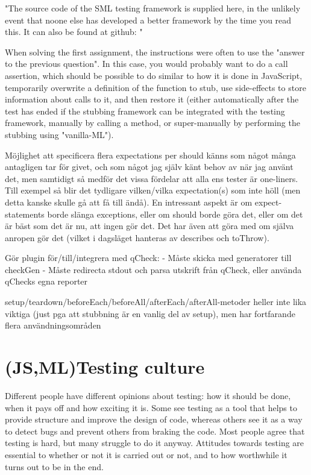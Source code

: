\documentclass[11pt]{article}
\begin{document}
"The source code of the SML testing framework is supplied here, in the unlikely event that noone else has developed a better framework by the time you read this. It can also be found at github: \url{}"

When solving the first assignment, the instructions were often to use the "answer to the previous question". In this case, you would probably want to do a call assertion, which should be possible to do similar to how it is done in JavaScript, temporarily overwrite a definition of the function to stub, use side-effects to store information about calls to it, and then restore it (either automatically after the test has ended if the stubbing framework can be integrated with the testing framework, manually by calling a method, or super-manually by performing the stubbing using "vanilla-ML").

Möjlighet att specificera flera expectations per should känns som något många antagligen tar för givet, och som något jag själv känt behov av när jag använt det, men samtidigt så medför det vissa fördelar att alla ens tester är one-liners. Till exempel så blir det tydligare vilken/vilka expectation(s) som inte höll (men detta kanske skulle gå att få till ändå). En intressant aspekt är om expect-statements borde slänga exceptions, eller om should borde göra det, eller om det är bäst som det är nu, att ingen gör det. Det har även att göra med om själva anropen gör det (vilket i dagsläget hanteras av describes och toThrow).

Gör plugin för/till/integrera med qCheck:
- Måste skicka med generatorer till checkGen
- Måste redirecta stdout och parsa utskrift från qCheck, eller använda qChecks egna reporter

setup/teardown/beforeEach/beforeAll/afterEach/afterAll-metoder heller inte lika viktiga (just pga att stubbning är en vanlig del av setup), men har fortfarande flera användningsområden

\section{(JS,ML)Testing culture}
\label{sec:testingculture}

Different people have different opinions about testing: how it should be done, when it pays off and how exciting it is. Some see testing as a tool that helps to provide structure and improve the design of code, whereas others see it as a way to detect bugs and prevent others from braking the code. Most people agree that testing is hard, but many struggle to do it anyway. Attitudes towards testing are essential to whether or not it is carried out or not, and to how worthwhile it turns out to be in the end.
\end{document}
